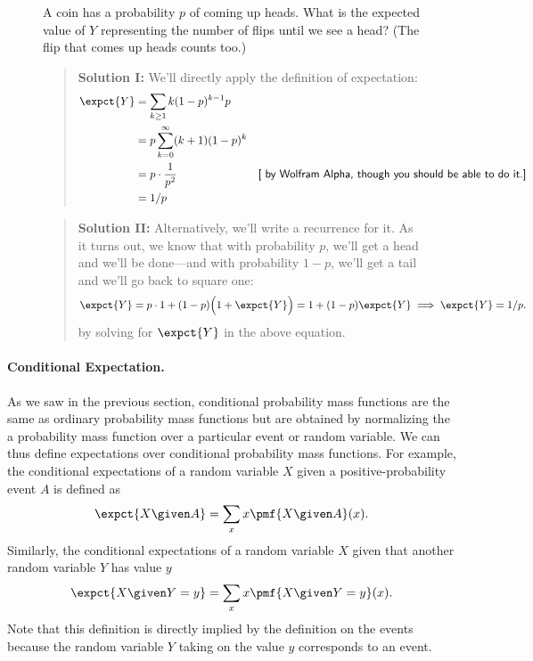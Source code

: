 {\begin{figure}
\begin{example}
  A coin has a probability $p$ of coming up heads. What is the expected value of
  $Y$ representing the number of flips until we see a head? (The flip that comes
  up heads counts too.)
  \begin{quote}
    \normalfont\textbf{Solution I:} We'll directly apply the definition of
    expectation:
    \begin{align*}
      \expct{Y} &= \sum_{k \geq1} k(1-p)^{k-1}p \\
      &= p \sum_{k=0}^\infty (k+1) (1-p)^k\\
      &= p \cdot \frac1{p^2} &\text{\textsf{[ by Wolfram Alpha, though you should be able to do it.]}} \\
      &= 1/p
    \end{align*}
  \end{quote}

  \begin{quote}
    \normalfont\textbf{Solution II:} Alternatively, we'll write a recurrence for
    it. As it turns out, we know that with probability $p$, we'll get a head and
    we'll be done---and with probability $1 - p$, we'll get a tail and we'll go
    back to square one:
    \begin{align*}
      \expct{Y} = p \cdot 1 + (1-p)\Big( 1 + \expct{Y}\Big) = 1 + (1 -
      p)\expct{Y} \implies \expct{Y} = 1/p.
    \end{align*}
    by solving for $\expct{Y}$ in the above equation.
  \end{quote}
\end{example}
\end{figure}




\paragraph{Conditional Expectation.}

As we saw in the previous section, conditional probability mass
functions are the same as ordinary probability mass functions but are
obtained by normalizing the a probability mass function over a
particular event or random variable.
%
We can thus define expectations over conditional probability mass
functions.
%
For example, the conditional expectations of a random variable $X$
given a positive-probability event $A$ is defined as 
\[
\expct{X \given A} = \sum_{x}{x \pmf{X \given A} (x)}.
\]
%
Similarly,  the conditional expectations of a random variable $X$
given that another random variable $Y$ has value $y$
\[
\expct{X \given Y = y} = \sum_{x}{x \pmf{X \given Y = y} (x)}.
\]
%
Note that this definition is directly implied by the definition on the
events because the random variable $Y$ taking on the value $y$
corresponds to an event. 

}
